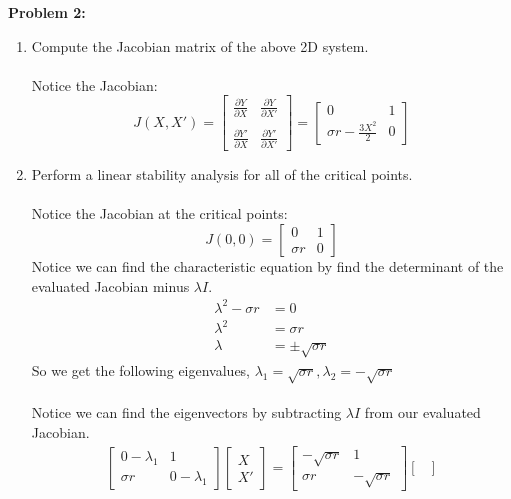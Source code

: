 \documentclass[11pt]{article}
\newenvironment{problem}[1]{\textbf{Problem #1: }}{\newpage}
\begin{document}
\begin{problem}{2}
\begin{enumerate}[label = (\alph*)]
			\item  Compute the Jacobian matrix of the above 2D system.
			\\ \\
			Notice the Jacobian:
			\[
			J(X,X') = 
			\begin{bmatrix}
				\frac{\partial Y}{\partial X} & \frac{\partial Y}{\partial X'} \\ \\
				\frac{\partial Y'}{\partial X} & \frac{\partial Y'}{\partial X'}
			\end{bmatrix} =
			\begin{bmatrix}
				0 & 1 \\
				\sigma r - \frac{3X^2}{2} & 0
			\end{bmatrix}
			\]
			\item Perform a linear stability analysis for all of the critical points.
			\\ \\
			Notice the Jacobian at the critical points:
			\[J(0,0) = \begin{bmatrix}
			0 & 1 \\ \sigma r & 0 
			\end{bmatrix}\]
			Notice we can find the characteristic equation by find the determinant of the evaluated Jacobian minus $\lambda I$.
			\begin{align*}
				\lambda^2 - \sigma r&= 0 \\
				\lambda^2 &= \sigma r \\
				\lambda &= \pm \sqrt{\sigma r}
			\end{align*}
			So we get the following eigenvalues, $\lambda_1 = \sqrt{\sigma r}, \lambda_2 = -\sqrt{\sigma r}$
			\\ \\
			Notice we can find the eigenvectors by subtracting $\lambda I$ from our evaluated Jacobian.
			\begin{align*}
				\begin{bmatrix}
				0-\lambda_1 & 1 \\ \sigma r & 0-\lambda_1 
				\end{bmatrix}\begin{bmatrix}
					X \\ X'
				\end{bmatrix} = 
				\begin{bmatrix}
				-\sqrt{\sigma r} & 1 \\ \sigma r & -\sqrt{\sigma r}
				\end{bmatrix}\begin{bmatrix}

\end{bmatrix}
\end{align*}
\end{enumerate}
\end{problem}
\end{document}
